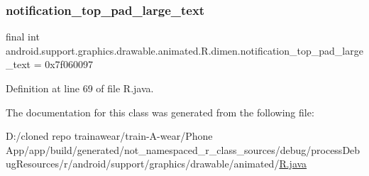 \subsubsection{\texorpdfstring{notification\_top\_pad\_large\_text}{notification\_top\_pad\_large\_text}}
{\footnotesize\ttfamily final int android.\+support.\+graphics.\+drawable.\+animated.\+R.\+dimen.\+notification\+\_\+top\+\_\+pad\+\_\+large\+\_\+text = 0x7f060097\hspace{0.3cm}{\ttfamily [static]}}



Definition at line 69 of file R.\+java.



The documentation for this class was generated from the following file\+:\begin{DoxyCompactItemize}
\item 
D\+:/cloned repo trainawear/train-\/\+A-\/wear/\+Phone App/app/build/generated/not\+\_\+namespaced\+\_\+r\+\_\+class\+\_\+sources/debug/process\+Debug\+Resources/r/android/support/graphics/drawable/animated/\mbox{\hyperlink{process_debug_resources_2r_2android_2support_2graphics_2drawable_2animated_2_r_8java}{R.\+java}}\end{DoxyCompactItemize}
